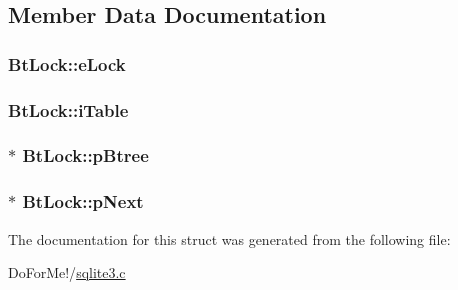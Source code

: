 \subsection{Member Data Documentation}
\hypertarget{struct_bt_lock_abe07b71018ee423e0d94b5cdba044b5c}{
\subsubsection[{e\-Lock}]{ Bt\-Lock\-::e\-Lock}}\label{struct_bt_lock_abe07b71018ee423e0d94b5cdba044b5c}
\hypertarget{struct_bt_lock_a822efcf018d6c8eb343341cde5df980d}{
\subsubsection[{i\-Table}]{ Bt\-Lock\-::i\-Table}}\label{struct_bt_lock_a822efcf018d6c8eb343341cde5df980d}
\hypertarget{struct_bt_lock_ab9125b8e79d480b75f3af21cb2ab55c7}{
\subsubsection[{p\-Btree}]{$\ast$ Bt\-Lock\-::p\-Btree}}\label{struct_bt_lock_ab9125b8e79d480b75f3af21cb2ab55c7}
\hypertarget{struct_bt_lock_ad42de86209c7aab43604c52a549b7bca}{
\subsubsection[{p\-Next}]{$\ast$ Bt\-Lock\-::p\-Next}}\label{struct_bt_lock_ad42de86209c7aab43604c52a549b7bca}


The documentation for this struct was generated from the following file\-:\begin{DoxyCompactItemize}
\item 
Do\-For\-Me!/\hyperlink{sqlite3_8c}{sqlite3.\-c}\end{DoxyCompactItemize}
